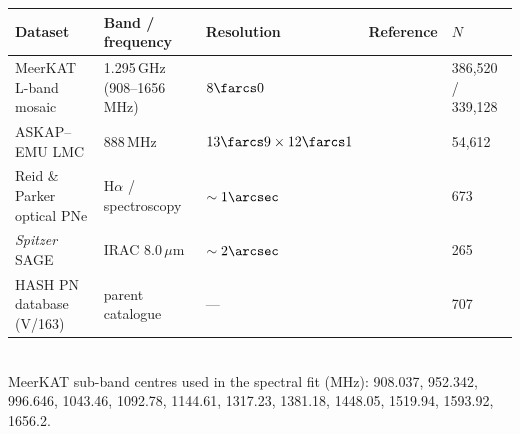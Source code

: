 \begin{tabular}{lllll}
\toprule
Dataset & Band / frequency & Resolution & Reference & $N$ \\
\midrule
MeerKAT L-band mosaic & 1.295\,GHz (908--1656\,MHz) & $8\farcs0$ & \citet{2026arXiv260305966R} & 386{,}520 / 339{,}128 \\
ASKAP--EMU LMC & 888\,MHz & $13\farcs9\times12\farcs1$ & \citet{2021MNRAS.506.3540P} & 54{,}612 \\
Reid \& Parker optical PNe & H$\alpha$ / spectroscopy & $\sim1\arcsec$ & \citet{2006MNRAS.373..521R, 2014MNRAS.438.2642R} & 673 \\
\textit{Spitzer} SAGE & IRAC 8.0\,\ensuremath{\mu}m & $\sim2\arcsec$ & \citet{2006AJ....132.2268M, 2011AJ....142..102G} & 265 \\
HASH PN database (V/163) & parent catalogue & --- & \citet{2016JPhCS.728c2008P} & 707 \\
\bottomrule
\end{tabular}
\\[2pt]
{\footnotesize MeerKAT sub-band centres used in the spectral fit (MHz): 908.037, 952.342, 996.646, 1043.46, 1092.78, 1144.61, 1317.23, 1381.18, 1448.05, 1519.94, 1593.92, 1656.2.}
